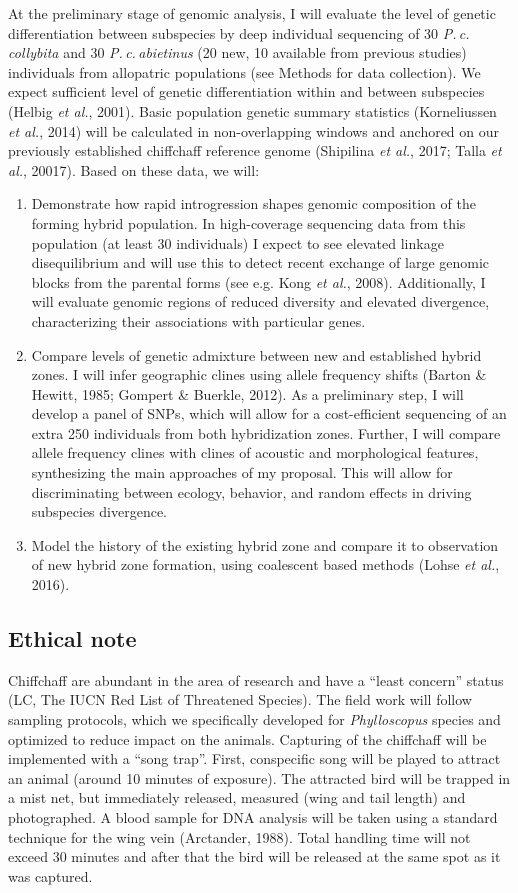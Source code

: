 \documentclass[11pt,a4paper]{article}
\begin{document}
At the preliminary stage of genomic analysis, I will evaluate the level of genetic differentiation between subspecies by deep individual sequencing of 30 \textit{P.\,c.\,collybita} and 30 \textit{P.\,c.\,abietinus}  (20 new, 10 available from previous studies) individuals from allopatric populations (see Methods for data collection). We expect sufficient level of genetic differentiation within and between subspecies (Helbig \textit{et al.}, 2001). Basic population genetic summary statistics (Korneliussen \textit{et al.}, 2014) will be calculated in non-overlapping windows and anchored on our previously established chiffchaff reference genome (Shipilina \textit{et al.}, 2017; Talla \textit{et al.}, 20017). Based on these data, we will: 
\begin{enumerate} 
\item Demonstrate how rapid introgression shapes genomic composition of the forming hybrid population. In high-coverage sequencing data from this population (at least 30 individuals) I expect to see elevated linkage disequilibrium and will use this to detect recent exchange of large genomic blocks from the parental forms (see e.g. Kong \textit{et al.}, 2008). Additionally, I will evaluate genomic regions of reduced diversity and elevated divergence, characterizing their associations with particular genes.
\item Compare levels of genetic admixture between new and established hybrid zones. I will infer geographic clines using allele frequency shifts (Barton \& Hewitt, 1985; Gompert \& Buerkle, 2012). As a preliminary step, I will develop a panel of SNPs, which will allow for a cost-efficient sequencing of an extra 250 individuals from both hybridization zones. Further, I will compare allele frequency clines with clines of acoustic and morphological features, synthesizing the main approaches of my proposal. This will allow for discriminating between ecology, behavior, and random effects in driving subspecies divergence.
\item Model the history of the existing hybrid zone and compare it to observation of new hybrid zone formation, using coalescent based methods (Lohse \textit{et al.}, 2016).
\end{enumerate} 

\subsection{Ethical note}
Chiffchaff are abundant in the area of research and have a “least concern” status (LC, The IUCN Red List of Threatened Species). The field work will follow sampling protocols, which we specifically developed for \textit{Phylloscopus} species and optimized to reduce impact on the animals. Capturing of the chiffchaff will be implemented with a “song trap”. First, conspecific song will be played to attract an animal (around 10 minutes of exposure). The attracted bird will be trapped in a mist net, but immediately released, measured (wing and tail length) and photographed. A blood sample for DNA analysis will be taken using a standard technique for the wing vein (Arctander, 1988). Total handling time will not exceed 30 minutes and after that the bird will be released at the same spot as it was captured. 
\end{document}
